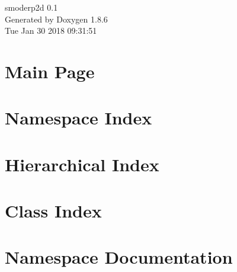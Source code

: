 \documentclass[twoside]{book}
\newcommand{\clearemptydoublepage}{%
  \newpage{\pagestyle{empty}\cleardoublepage}%
}
\begin{document}
\hypersetup{pageanchor=false}
\begin{titlepage}
\vspace*{7cm}
\begin{center}%
{\Large smoderp2d 0.1 }\\
\vspace*{1cm}
{\large Generated by Doxygen 1.8.6}\\
\vspace*{0.5cm}
{\small Tue Jan 30 2018 09:31:51}\\
\end{center}
\end{titlepage}
\clearemptydoublepage
\tableofcontents
\clearemptydoublepage
{}
\hypersetup{pageanchor=true}

\chapter{Main Page}
\label{index}\hypertarget{index}{}
\chapter{Namespace Index}

\chapter{Hierarchical Index}

\chapter{Class Index}

\chapter{Namespace Documentation}














\end{document}
